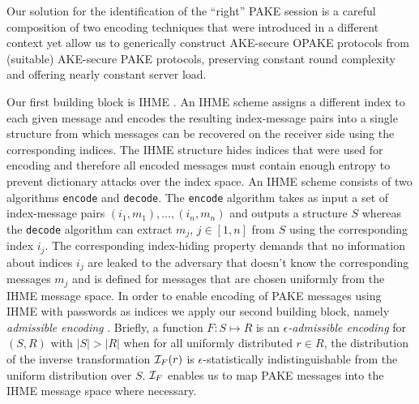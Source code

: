Our solution for the identification of the ``right'' \ac{PAKE} session is a careful composition of two encoding techniques that were introduced in a different context yet allow us to generically construct \ac{AKE}-secure \ac{OPAKE} protocols from (suitable) \ac{AKE}-secure \ac{PAKE} protocols, preserving constant round complexity and offering nearly constant server load.

Our first building block is \ac{IHME} \cite{Manulis2010,Manulis2011}.
An \ac{IHME} scheme assigns a different index to each given message and encodes the resulting index-message pairs into a single structure from which messages can be recovered on the receiver side using the corresponding indices.
The \ac{IHME} structure hides indices that were used for encoding and therefore all encoded messages must contain enough entropy to prevent dictionary attacks over the index space.
An \ac{IHME} scheme consists of two algorithms \texttt{encode} and \texttt{decode}.
The \texttt{encode} algorithm takes as input a set of index-message pairs $(i_1, m_1),\ldots,(i_n, m_n)$ and outputs a structure $S$ whereas the \texttt{decode} algorithm can extract $m_j$, $j\in[1,n]$ from $S$ using the corresponding index $i_j$.
The corresponding index-hiding property demands that no information about indices $i_j$ are leaked to the adversary that doesn't know the corresponding messages $m_j$ and is defined for messages that are chosen uniformly from the \ac{IHME} message space.
In order to enable encoding of \ac{PAKE} messages using \ac{IHME} with passwords as indices we apply our second building block, namely \emph{admissible encoding} \cite{BonehF01,BrierCIMRT10,pseudorandomSignatures}.
Briefly, a function $F:S\mapsto R$ is an \emph{$\epsilon$-admissible encoding} for $(S,R)$ with $|S|>|R|$ when for all uniformly distributed $r\in R$, the distribution of the inverse transformation $\mathcal{I}_F(r)$ is $\epsilon$-statistically indistinguishable from the uniform distribution over $S$.
$\mathcal{I}_F$ enables us to map \ac{PAKE} messages into the \ac{IHME} message space where necessary.

